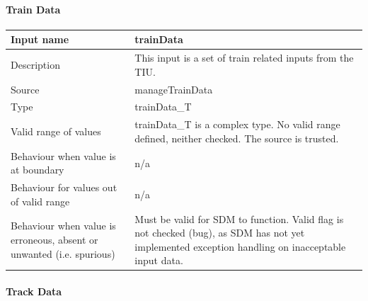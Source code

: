 \paragraph{Train Data}

\begin{longtable}{p{}p{}}
\toprule
Input name				& trainData \\
\midrule
Description				& This input is a set of train related inputs from the TIU. \\
\midrule
Source					& manageTrainData \\ 
\midrule
Type					& trainData\_T \\
\midrule
Valid range of values	& trainData\_T is a complex type. No valid range defined, neither checked. The source is trusted. \\
\midrule
Behaviour when value is at boundary	& n/a \\
\midrule
Behaviour for values out of valid range	& n/a \\
\midrule
Behaviour when value is erroneous, absent or unwanted (i.e. spurious) & Must be valid for SDM to function. Valid flag is not checked (bug), as SDM has not yet implemented exception handling on inacceptable input data. \\
\bottomrule
\end{longtable}

\paragraph{Track Data}

